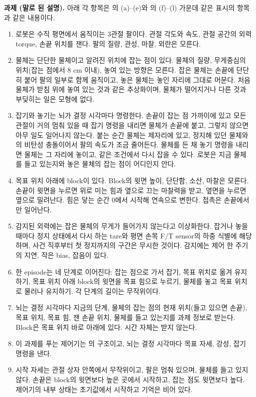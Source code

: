 \documentclass[11pt]{article}\usepackage[margin=1in]{geometry}\usepackage{amsmath,amssymb,amsthm,mathtools}\usepackage{graphicx}\graphicspath{{figures/}{../figures/}{figs/}{./}}\usepackage{enumitem}\usepackage{hyperref}\usepackage{cleveref}\usepackage{tikz}\usetikzlibrary{arrows.meta,positioning,calc,shapes.geometric}\usepackage{float}\usepackage{rotating}\usepackage[most]{tcolorbox}\usepackage{kotex}\usepackage{booktabs}\usepackage{longtable}\emergencystretch=1.6em\tolerance=2000 \crefname{assumption}{Assumption}{Assumptions}\Crefname{assumption}{Assumption}{Assumptions}\crefname{definition}{Definition}{Definitions}\Crefname{definition}{Definition}{Definitions}\crefname{proposition}{Proposition}{Propositions}\Crefname{proposition}{Proposition}{Propositions}\crefname{fact}{Fact}{Facts}\Crefname{fact}{Fact}{Facts} \newtheorem{assumption}{Assumption}\newtheorem{definition}{Definition}\newtheorem{lemma}{Lemma}\newtheorem{proposition}{Proposition}\newtheorem{theorem}{Theorem}\newtheorem{corollary}{Corollary}\newtheorem{fact}{Fact}\theoremstyle{remark}\newtheorem{remark}{Remark} \newcommand{\R}{\mathbb{R}}\newcommand{\xb}{\bar x}\newcommand{\Ab}{\bar A}\newcommand{\By}{\bar B_y}\newcommand{\U}{\mathcal U}\newcommand{\Z}{\mathcal Z}
\begin{document}
\textbf{과제 (말로 된 설명).} 아래 각 항목은 의 (a)--(e)와 의 (f)--(l) 가운데 같은 표시의 항목과 같은 내용이다.
\begin{enumerate}[label=(\alph*)]
\item 로봇은 수직 평면에서 움직이는 3관절 팔이다. 관절 각도와 속도, 관절 공간의 외력 torque, 손끝 위치를 잰다. 팔의 질량, 관성, 마찰, 외란은 모른다.
\item 물체는 단단한 물체이고 알려진 위치에 잡는 점이 있다. 물체의 질량, 무게중심의 위치(잡는 점에서 8 cm 이내), 놓여 있는 방향은 모른다. 잡은 물체는 손끝에 단단히 붙어 팔의 일부로 함께 움직이고, 놓은 물체는 놓인 자리에 그대로 머문다. 처음 물체가 받침 위에 놓여 있는 것과 같은 추상화이며, 물체가 떨어지거나 다른 것과 부딪히는 일은 모형에 없다.
\item 잡기와 놓기는 뇌가 결정 시각마다 명령한다. 손끝이 잡는 점 가까이에 있고 모든 관절이 거의 멈춰 있을 때 잡기 명령을 내리면 물체가 손끝에 붙고, 그렇지 않으면 아무 일도 일어나지 않는다. 붙는 순간 물체는 제자리에 있고, 정지해 있던 물체와의 비탄성 충돌이어서 팔의 속도가 조금 줄어든다. 물체를 든 채 놓기 명령을 내리면 물체는 그 자리에 놓이고, 같은 조건에서 다시 잡을 수 있다. 로봇은 지금 물체를 들고 있는지와 놓은 물체의 잡는 점이 어디인지 안다.
\item 목표 위치 아래에 block이 있다. Block의 윗면 높이, 단단함, 소산, 마찰은 모른다. 손끝이 윗면을 누르면 위로 미는 힘과 옆으로 끄는 마찰력을 받고, 옆면을 누르면 옆으로 밀려난다. 힘은 닿는 순간 0에서 시작해 연속으로 변한다. 접촉은 손끝에서만 일어난다.
\item 감지된 외력에는 잡은 물체의 무게가 들어가지 않는다고 이상화한다. 잡거나 놓을 때마다 정지 상태에서 다시 하는 tare와 평면 손목 F/T sensor의 하중 식별에 해당하며, 사건 직후부터 첫 정지까지의 구간은 무시한 것이다. 감지에는 제어 한 주기의 지연, 작은 bias, 잡음이 있다.
\item 한 episode는 네 단계로 이어진다: 잡는 점으로 가서 잡기, 목표 위치로 옮겨 유지하기, 목표 위치 아래 block의 윗면을 목표 힘으로 누르기, 물체를 놓고 목표 위치로 물러나 유지하기. 각 단계의 길이는 무작위이다.
\item 뇌는 결정 시각마다 지금의 단계, 물체의 잡는 점의 현재 위치(들고 있으면 손끝), 목표 위치, 목표 힘, 잰 손끝 위치, 물체를 들고 있는지를 과제 정보로 받는다. Block은 목표 위치 바로 아래에 있다. 시간 자체는 받지 않는다.
\item 이 과제를 푸는 제어기는 의 구조이고, 뇌는 결정 시각마다 목표 자세, 강성, 잡기 명령을 낸다.
\item 시작 자세는 관절 상자 안쪽에서 무작위이고, 팔은 멈춰 있으며, 물체를 들고 있지 않다. 손끝은 block의 윗면보다 높은 곳에서 시작하고, 잡는 점도 윗면보다 높다. 제어기의 내부 상태는 초기값에서 시작하고 기억은 비어 있다.

\end{enumerate}
\end{document}
